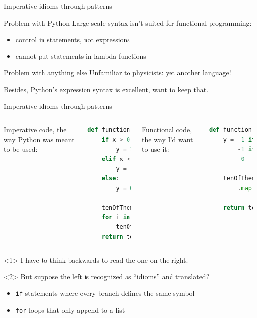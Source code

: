 \documentclass{beamer}
\begin{document}
\begin{frame}{Imperative idioms through patterns}
\begin{block}{Problem with Python}
Large-scale syntax isn't suited for functional programming:
\begin{itemize}
\item control in statements, not expressions
\item cannot put statements in lambda functions
\end{itemize}
\end{block}

\vspace{0.25 cm}
\begin{block}{Problem with anything else}
Unfamiliar to physicists: yet another language!

\vspace{0.3 cm}
Besides, Python's expression syntax is excellent, want to keep that.
\end{block}
\end{frame}

\begin{frame}[fragile]{Imperative idioms through patterns}
\vfill
\begin{columns}
Imperative code, the way Python was meant to be used:

\begin{lstlisting}[language=python, basicstyle=\ttfamily\scriptsize]
def function(x: (-inf, inf)):
    if x > 0:
        y = 1
    elif x < 0:
        y = -1
    else:
        y = 0

    tenOfThem = []
    for i in range(10):
        tenOfThem.append(y)
    return tenOfThem
\end{lstlisting}

Functional code, the way I'd want to use it:

\begin{lstlisting}[language=python, basicstyle=\ttfamily\scriptsize]
def function(x: (-inf, inf)):
    y =  1 if x > 0 else
        -1 if x < 0 else
         0

    tenOfThem = range(10) \
        .map(lambda i: y)

    return tenOfThem



\end{lstlisting}
\end{columns}

\vfill
\begin{onlyenv}<1>
I have to think backwards to read the one on the right.
\end{onlyenv}
\begin{onlyenv}<2>
But suppose the left is recognized as ``idioms'' and translated?
\begin{itemize}
\item {\tt \small if} statements where every branch defines the same symbol
\item {\tt \small for} loops that only append to a list
\end{itemize}
\end{onlyenv}
\end{frame}
\end{document}
